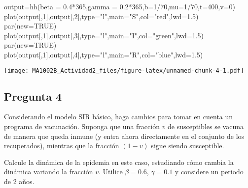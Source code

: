 \documentclass[
]{article}
\newenvironment{Shaded}{\begin{snugshade}}{\end{snugshade}}
\newcommand{\AttributeTok}[1]{\textcolor[rgb]{0.77,0.63,0.00}{#1}}
\newcommand{\ConstantTok}[1]{\textcolor[rgb]{0.00,0.00,0.00}{#1}}
\newcommand{\DecValTok}[1]{\textcolor[rgb]{0.00,0.00,0.81}{#1}}
\newcommand{\FloatTok}[1]{\textcolor[rgb]{0.00,0.00,0.81}{#1}}
\newcommand{\FunctionTok}[1]{\textcolor[rgb]{0.00,0.00,0.00}{#1}}
\newcommand{\NormalTok}[1]{#1}
\newcommand{\OtherTok}[1]{\textcolor[rgb]{0.56,0.35,0.01}{#1}}
\newcommand{\SpecialCharTok}[1]{\textcolor[rgb]{0.00,0.00,0.00}{#1}}
\newcommand{\StringTok}[1]{\textcolor[rgb]{0.31,0.60,0.02}{#1}}
\begin{document}
\begin{Shaded}
\begin{Highlighting}[]
\NormalTok{output}\OtherTok{=}\FunctionTok{hh}\NormalTok{(}\AttributeTok{beta =} \FloatTok{0.4}\SpecialCharTok{*}\DecValTok{365}\NormalTok{,}\AttributeTok{gamma =} \FloatTok{0.2}\SpecialCharTok{*}\DecValTok{365}\NormalTok{,}\AttributeTok{b=}\DecValTok{1}\SpecialCharTok{/}\DecValTok{70}\NormalTok{,}\AttributeTok{mu=}\DecValTok{1}\SpecialCharTok{/}\DecValTok{70}\NormalTok{,}\AttributeTok{t=}\DecValTok{400}\NormalTok{,}\AttributeTok{v=}\DecValTok{0}\NormalTok{)}
\FunctionTok{plot}\NormalTok{(output[,}\DecValTok{1}\NormalTok{],output[,}\DecValTok{2}\NormalTok{],}\AttributeTok{type=}\StringTok{"l"}\NormalTok{,}\AttributeTok{main=}\StringTok{"S"}\NormalTok{,}\AttributeTok{col=}\StringTok{"red"}\NormalTok{,}\AttributeTok{lwd=}\FloatTok{1.5}\NormalTok{)}
\FunctionTok{par}\NormalTok{(}\AttributeTok{new=}\ConstantTok{TRUE}\NormalTok{)}
\FunctionTok{plot}\NormalTok{(output[,}\DecValTok{1}\NormalTok{],output[,}\DecValTok{3}\NormalTok{],}\AttributeTok{type=}\StringTok{"l"}\NormalTok{,}\AttributeTok{main=}\StringTok{"I"}\NormalTok{,}\AttributeTok{col=}\StringTok{"green"}\NormalTok{,}\AttributeTok{lwd=}\FloatTok{1.5}\NormalTok{)}
\FunctionTok{par}\NormalTok{(}\AttributeTok{new=}\ConstantTok{TRUE}\NormalTok{)}
\FunctionTok{plot}\NormalTok{(output[,}\DecValTok{1}\NormalTok{],output[,}\DecValTok{4}\NormalTok{],}\AttributeTok{type=}\StringTok{"l"}\NormalTok{,}\AttributeTok{main=}\StringTok{"R"}\NormalTok{,}\AttributeTok{col=}\StringTok{"blue"}\NormalTok{,}\AttributeTok{lwd=}\FloatTok{1.5}\NormalTok{)}
\end{Highlighting}
\end{Shaded}

\texttt{[image: MA1002B\_Actividad2\_files/figure-latex/unnamed-chunk-4-1.pdf]}

\hypertarget{pregunta-4}{%
\subsection{Pregunta 4}\label{pregunta-4}}

Considerando el modelo SIR básico, haga cambios para tomar en cuenta un
programa de vacunación. Suponga que una fracción \(v\) de susceptibles
se vacuna de manera que queda inmune (y entra ahora directamente en el
conjunto de los recuperados), mientras que la fracción \((1-v)\) sigue
siendo susceptible.

Calcule la dinámica de la epidemia en este caso, estudiando cómo cambia
la dinámica variando la fracción \(v\). Utilice \(\beta=0.6\),
\(\gamma=0.1\) y considere un periodo de 2 años.
\end{document}
